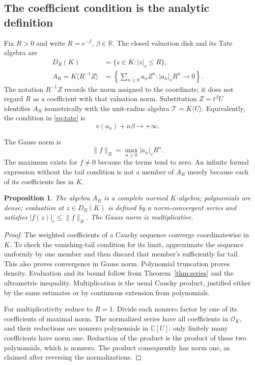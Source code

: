 \documentclass[11pt,a4paper]{article}
\numberwithin{equation}{section}
\newtheorem{proposition}[theorem]{Proposition}
\theoremstyle{definition}
\theoremstyle{remark}
\newcommand{\C}{\mathbb C}
\newcommand{\R}{\mathbb R}
\newcommand{\OO}{\mathcal O}
\newcommand{\TT}{\mathcal T}
\newcommand{\vabs}[1]{\lvert#1\rvert_v}
\newcommand{\Gauss}[2]{\lVert#1\rVert_{#2}}
\begin{document}
\subsection{The coefficient condition is the analytic definition}
Fix $R>0$ and write $R=e^{-\beta}$, $\beta\in\R$. The closed valuation disk
and its Tate algebra are
\begin{align}
 D_R(K)&=\{z\in K:\vabs z\le R\},\label{eq:disk}\\
 A_R=K\langle R^{-1}Z\rangle
 &=\left\{\sum_{n\ge0}a_nZ^n:\vabs{a_n}R^n\longrightarrow0\right\}.
 \label{eq:tate}
\end{align}
The notation $R^{-1}Z$ records the norm assigned to the coordinate; it does not
regard $R$ as a coefficient with that valuation norm. Substitution $Z=t^\beta U$
identifies $A_R$ isometrically with the unit-radius algebra
$\TT=K\langle U\rangle$. Equivalently, the condition in \eqref{eq:tate} is
\begin{equation}\label{eq:tatevaluation}
 v(a_n)+n\beta\longrightarrow+\infty.
\end{equation}

The Gauss norm is
\[
 \Gauss fR=\max_{n\ge0}\vabs{a_n}R^n.
\]
The maximum exists for $f\ne0$ because the terms tend to zero. An infinite
formal expression without the tail condition is not a member of $A_R$ merely
because each of its coefficients lies in $K$.

\begin{proposition}\label{prop:banach}
The algebra $A_R$ is a complete normed $K$-algebra; polynomials are dense;
evaluation at $z\in D_R(K)$ is defined by a norm-convergent series and satisfies
$\vabs{f(z)}\le\Gauss fR$. The Gauss norm is multiplicative.
\end{proposition}
\begin{proof}
The weighted coefficients of a Cauchy sequence converge coordinatewise in $K$.
To check the vanishing-tail condition for its limit, approximate the sequence
uniformly by one member and then discard that member's sufficiently far tail.
This also proves convergence in Gauss norm. Polynomial truncation proves
density. Evaluation and its bound follow from Theorem~\ref{thm:series} and the
ultrametric inequality. Multiplication is the usual Cauchy product, justified
either by the same estimates or by continuous extension from polynomials.

For multiplicativity reduce to $R=1$. Divide each nonzero factor by one of its
coefficients of maximal norm. The normalized series have all coefficients in
$\OO_K$, and their reductions are nonzero polynomials in $\C[U]$: only finitely
many coefficients have norm one. Reduction of the product is the product of
these two polynomials, which is nonzero. The product consequently has norm one,
as claimed after reversing the normalizations.
\end{proof}
\end{document}
